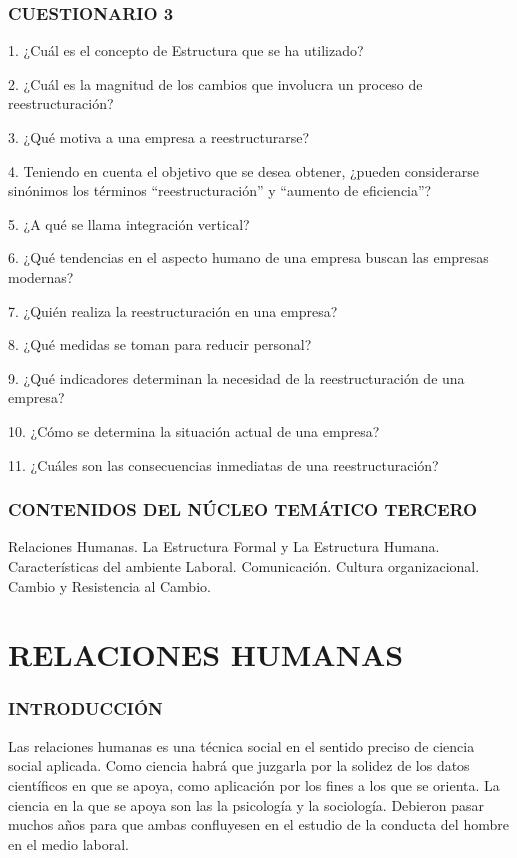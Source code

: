 
\subsubsection*{CUESTIONARIO 3}
1. ¿Cuál es el concepto de Estructura que se ha utilizado?

2. ¿Cuál es la magnitud de los cambios que involucra un proceso de reestructuración?

3. ¿Qué motiva a una empresa a reestructurarse?

4. Teniendo en cuenta el objetivo que se desea obtener, ¿pueden considerarse sinónimos los términos “reestructuración” y “aumento de eficiencia”?

5. ¿A qué se llama integración vertical?

6. ¿Qué tendencias en el aspecto humano de una empresa buscan las empresas modernas?

7. ¿Quién realiza la reestructuración en una empresa?

8. ¿Qué medidas se toman para reducir personal?

9. ¿Qué indicadores determinan la necesidad de la reestructuración de una empresa?

10. ¿Cómo se determina la situación actual de una empresa?

11. ¿Cuáles son las consecuencias inmediatas de una reestructuración?



\subsubsection*{CONTENIDOS DEL NÚCLEO TEMÁTICO TERCERO}
Relaciones Humanas. La Estructura Formal y La Estructura Humana. Características del ambiente Laboral. Comunicación. Cultura organizacional. Cambio y Resistencia al Cambio.

\section*{RELACIONES HUMANAS}
\subsubsection*{INTRODUCCIÓN}
Las relaciones humanas es una técnica social en el sentido preciso de ciencia social aplicada. Como ciencia habrá que juzgarla por la solidez de los datos científicos en que se apoya, como aplicación por los fines a los que se orienta. La ciencia en la que se apoya son las la psicología y la sociología. Debieron pasar muchos años para que ambas confluyesen en el estudio de la conducta del hombre en el medio laboral.

